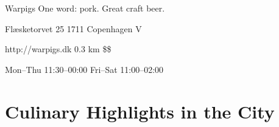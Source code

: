 \begin{left}
\begin{eventitem}
\begin{eventitem}
\begin{eventitem}
\begin{fooditem}
{\begin{ohours}
{}
{}
\end{ohours}}
\end{fooditem}
\begin{fooditem}
{Warpigs}
{One word: pork. Great craft beer.}
{\begin{addr}
{Flæsketorvet 25}
{1711 Copenhagen V}
\end{addr}}
{http://warpigs.dk}
{0.3 km}
{\$\$}
{\begin{ohours}
{Mon–Thu}
{11:30–00:00}
{Fri–Sat}
{11:00–02:00}
{}
{}
{}
{}
\end{ohours}}
\end{fooditem}






\section{Culinary Highlights in the City}


\end{eventitem}
\end{eventitem}
\end{eventitem}
\end{left}
